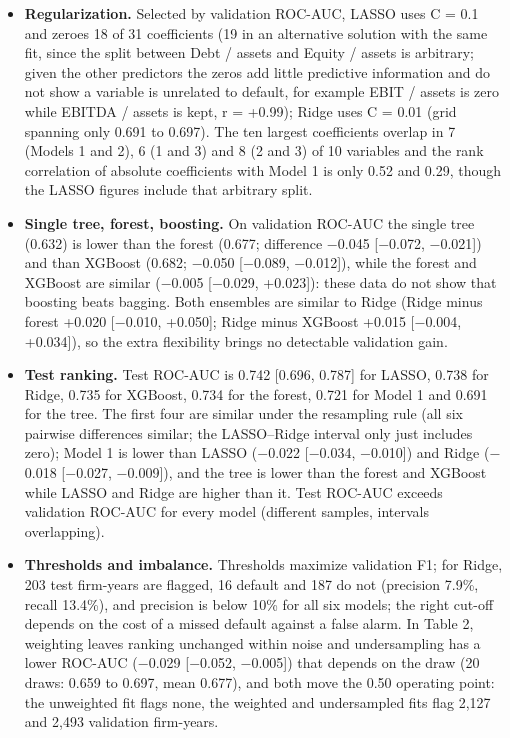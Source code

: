 \documentclass[9pt,letterpaper]{extarticle}
\begin{document}
\begin{itemize}
  \item \textbf{Regularization.} Selected by validation ROC-AUC, LASSO uses C = 0.1 and zeroes 18 of 31 coefficients (19 in an alternative solution with the same fit, since the split between Debt / assets and Equity / assets is arbitrary; given the other predictors the zeros add little predictive information and do not show a variable is unrelated to default, for example EBIT / assets is zero while EBITDA / assets is kept, r = +0.99); Ridge uses C = 0.01 (grid spanning only 0.691 to 0.697). The ten largest coefficients overlap in 7 (Models 1 and 2), 6 (1 and 3) and 8 (2 and 3) of 10 variables and the rank correlation of absolute coefficients with Model 1 is only 0.52 and 0.29, though the LASSO figures include that arbitrary split.
  \item \textbf{Single tree, forest, boosting.} On validation ROC-AUC the single tree (0.632) is lower than the forest (0.677; difference $-$0.045 [$-$0.072, $-$0.021]) and than XGBoost (0.682; $-$0.050 [$-$0.089, $-$0.012]), while the forest and XGBoost are similar ($-$0.005 [$-$0.029, +0.023]): these data do not show that boosting beats bagging. Both ensembles are similar to Ridge (Ridge minus forest +0.020 [$-$0.010, +0.050]; Ridge minus XGBoost +0.015 [$-$0.004, +0.034]), so the extra flexibility brings no detectable validation gain.
  \item \textbf{Test ranking.} Test ROC-AUC is 0.742 [0.696, 0.787] for LASSO, 0.738 for Ridge, 0.735 for XGBoost, 0.734 for the forest, 0.721 for Model 1 and 0.691 for the tree. The first four are similar under the resampling rule (all six pairwise differences similar; the LASSO--Ridge interval only just includes zero); Model 1 is lower than LASSO ($-$0.022 [$-$0.034, $-$0.010]) and Ridge ($-$0.018 [$-$0.027, $-$0.009]), and the tree is lower than the forest and XGBoost while LASSO and Ridge are higher than it. Test ROC-AUC exceeds validation ROC-AUC for every model (different samples, intervals overlapping).
  \item \textbf{Thresholds and imbalance.} Thresholds maximize validation F1; for Ridge, 203 test firm-years are flagged, 16 default and 187 do not (precision 7.9\%, recall 13.4\%), and precision is below 10\% for all six models; the right cut-off depends on the cost of a missed default against a false alarm. In Table 2, weighting leaves ranking unchanged within noise and undersampling has a lower ROC-AUC ($-$0.029 [$-$0.052, $-$0.005]) that depends on the draw (20 draws: 0.659 to 0.697, mean 0.677), and both move the 0.50 operating point: the unweighted fit flags none, the weighted and undersampled fits flag 2,127 and 2,493 validation firm-years.
\end{itemize}
\end{document}
